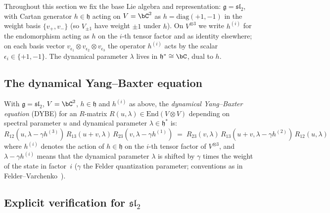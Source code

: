 Throughout this section we fix the base Lie algebra and representation: $\mathfrak{g} = \mathfrak{sl}_2$, with Cartan generator $h \in \mathfrak{h}$ acting on $V = \bC^2$ as $h = \mathrm{diag}(+1,-1)$ in the weight basis $\{v_+, v_-\}$ (so $V_{\pm 1}$ have weight $\pm 1$ under $h$). On $V^{\otimes 3}$ we write $h^{(i)}$ for the endomorphism acting as $h$ on the $i$-th tensor factor and as identity elsewhere; on each basis vector $v_{\epsilon_1}\otimes v_{\epsilon_2}\otimes v_{\epsilon_3}$ the operator $h^{(i)}$ acts by the scalar $\epsilon_i \in \{+1,-1\}$. The dynamical parameter $\lambda$ lives in $\mathfrak{h}^* \cong \bC$, dual to $h$.

\subsection{The dynamical Yang--Baxter equation}
\label{subsec:dybe-statement}

\begin{definition}
\label{def:dybe}
With $\mathfrak{g} = \mathfrak{sl}_2$, $V = \bC^2$, $h \in \mathfrak{h}$ and $h^{(i)}$ as above, the \emph{dynamical Yang--Baxter equation} (DYBE) for an
$R$-matrix $R(u, \lambda) \in \mathrm{End}(V \otimes V)$
depending on spectral parameter $u$ and dynamical parameter
$\lambda \in \mathfrak{h}^*$ is:
\begin{equation}\label{eq:dybe}
R_{12}(u, \lambda - \gamma h^{(3)})\,
R_{13}(u+v, \lambda)\,
R_{23}(v, \lambda - \gamma h^{(1)})
\;=\;
R_{23}(v, \lambda)\,
R_{13}(u+v, \lambda - \gamma h^{(2)})\,
R_{12}(u, \lambda)
\end{equation}
where $h^{(i)}$ denotes the action of $h \in \mathfrak{h}$ on
the $i$-th tensor factor of $V^{\otimes 3}$, and
$\lambda - \gamma h^{(i)}$ means that the dynamical parameter
$\lambda$ is shifted by $\gamma$ times the weight of the state in
factor~$i$ ($\gamma$ the Felder quantization parameter; conventions
as in Felder--Varchenko~\cite{Felder94,FelderVarchenko96}).
\end{definition}

\subsection{\texorpdfstring{Explicit verification for $\mathfrak{sl}_2$}{Explicit verification for sl2}}
\label{subsec:dybe-sl2-verification}

